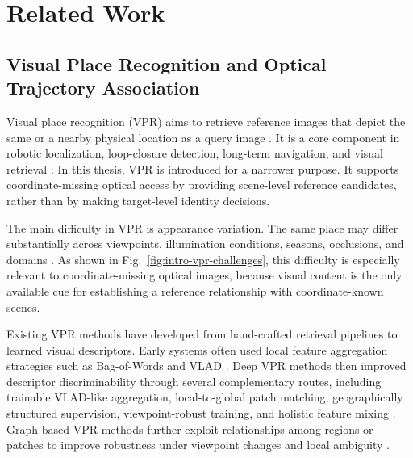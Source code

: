 \section{Related Work}

\subsection{Visual Place Recognition and Optical Trajectory Association}
Visual place recognition (VPR) aims to retrieve reference images that depict the same or a nearby physical location as a query image \cite{yin2025gprs,wang2026tfvpr}. It is a core component in robotic localization, loop-closure detection, long-term navigation, and visual retrieval \cite{murartal2017orbslam2,milford2008seqslam}. In this thesis, VPR is introduced for a narrower purpose. It supports coordinate-missing optical access by providing scene-level reference candidates, rather than by making target-level identity decisions.

The main difficulty in VPR is appearance variation. The same place may differ substantially across viewpoints, illumination conditions, seasons, occlusions, and domains \cite{yin2025gprs,wang2026tfvpr}. As shown in Fig.~\ref{fig:intro-vpr-challenges}, this difficulty is especially relevant to coordinate-missing optical images, because visual content is the only available cue for establishing a reference relationship with coordinate-known scenes.

Existing VPR methods have developed from hand-crafted retrieval pipelines to learned visual descriptors. Early systems often used local feature aggregation strategies such as Bag-of-Words and VLAD \cite{galvez2012bags,jegou2010vlad}. Deep VPR methods then improved descriptor discriminability through several complementary routes, including trainable VLAD-like aggregation, local-to-global patch matching, geographically structured supervision, viewpoint-robust training, and holistic feature mixing \cite{arandjelovic2016netvlad,hausler2021patchnetvlad,berton2022cosplace,berton2023eigenplaces,alibey2023mixvpr}. Graph-based VPR methods further exploit relationships among regions or patches to improve robustness under viewpoint changes and local ambiguity \cite{qin2021gatvpr,zuo2025prgs,chen2025sage}.

